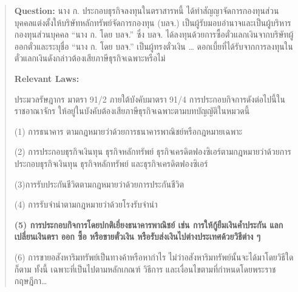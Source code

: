 \begin{quote}
    \begin{thai}
    \textbf{Question: } นาง ก. ประกอบธุรกิจลงทุนในตราสารหนี้ ได้ทำสัญญาจัดการกองทุนส่วนบุคคลแต่งตั้งให้บริษัทหลักทรัพย์จัดการกองทุน (บลจ.) เป็นผู้รับมอบอำนาจและเป็นผู้บริหารกองทุนส่วนบุคคล “นาง ก. โดย บลจ.” ซึ่ง บลจ. ได้ลงทุนด้วยการซื้อตั๋วแลกเงินจากบริษัทผู้ออกตั๋วและระบุชื่อ “นาง ก. โดย บลจ.” เป็นผู้ทรงตั๋วเงิน … ดอกเบี้ยที่ได้รับจากการลงทุนในตั๋วแลกเงินดังกล่าวต้องเสียภาษีธุรกิจเฉพาะหรือไม่
    
    \textbf{Relevant Laws: }
    
    ประมวลรัษฎากร มาตรา 91/2 ภายใต้บังคับมาตรา 91/4 การประกอบกิจการดังต่อไปนี้ในราชอาณาจักร ให้อยู่ในบังคับต้องเสียภาษีธุรกิจเฉพาะตามบทบัญญัติในหมวดนี้
    
(1) การธนาคาร ตามกฎหมายว่าด้วยการธนาคารพาณิชย์หรือกฎหมายเฉพาะ

(2) การประกอบธุรกิจเงินทุน ธุรกิจหลักทรัพย์ ธุรกิจเครดิตฟองซิเอร์ตามกฎหมายว่าด้วยการประกอบธุรกิจเงินทุน ธุรกิจหลักทรัพย์ และธุรกิจเครดิตฟองซิเอร์

(3)การรับประกันชีวิตตามกฎหมายว่าด้วยการประกันชีวิต

(4) การรับจำนำตามกฎหมายว่าด้วยโรงรับจำนำ

\textbf{(5) การประกอบกิจการโดยปกติเยี่ยงธนาคารพาณิชย์ เช่น การให้กู้ยืมเงินค้ำประกัน แลกเปลี่ยนเงินตรา ออก ซื้อ หรือขายตั๋วเงิน หรือรับส่งเงินไปต่างประเทศด้วยวิธีต่าง ๆ}

(6) การขายอสังหาริมทรัพย์เป็นทางค้าหรือหากำไร ไม่ว่าอสังหาริมทรัพย์นั้นจะได้มาโดยวิธีใดก็ตาม ทั้งนี้ เฉพาะที่เป็นไปตามหลักเกณฑ์ วิธีการ และเงื่อนไขตามที่กำหนดโดยพระราชกฤษฎีกา…
    \end{thai}
\end{quote}


